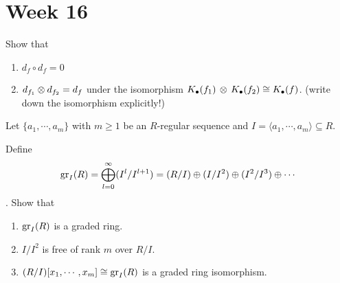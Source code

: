 
\section{Week 16}

\begin{exercise} Show that
  \begin{enumerate}
    \item $d_f \circ d_f = 0$
    \item $d_{f_1} \otimes d_{f_2} = d_f$ under the isomorphism 
      $K_\bullet (f_1) \, \otimes\, K_\bullet(f_2) \cong K_\bullet(f)$.
      (write down the isomorphism explicitly!)
  \end{enumerate}
\end{exercise}

\begin{exercise}
  Let $\{ a_1, \cdots, a_m \}$ with $m \ge 1$ be an $R$-regular sequence
  and $I = \langle a_1, \cdots, a_m \rangle \subseteq R$.

  Define 
  $$\operatorname{gr}_I(R) = \bigoplus\limits_{l=0}^\infty (I^l / I^{l+1}) = 
  (R / I) \oplus (I / I^2) \oplus (I^2 / I^3) \oplus \cdots$$.
  Show that
  \begin{enumerate}
    \item $\operatorname{gr}_I(R)$ is a graded ring.
    \item $I/I^2$ is free of rank $m$ over $R/I$.
    \item $(R/I)[x_1, \cdots, x_m] \cong \operatorname{gr}_I(R)$ is a graded ring isomorphism.
  \end{enumerate}
\end{exercise}
